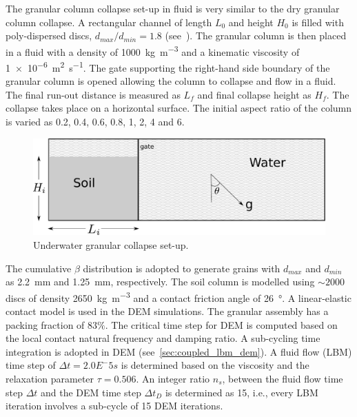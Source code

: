 The granular column collapse set-up in fluid is very similar to the dry 
granular column collapse. A rectangular channel of length $L_0$ and height 
$H_0$ is 
filled with poly-dispersed discs, $d_{max}/d_{min} = 1.8$  
(see~). The granular column is then placed in a fluid with a 
density of \SI{1000}{\kg\per\cubic\meter}  and a kinematic viscosity of 
\SI{1e-6}{\square\meter\per\second}. The gate supporting the right-hand side 
boundary of the granular column is opened allowing the column to collapse and 
flow in a fluid. The final run-out distance is measured as $L_f$ and 
final collapse height as $H_f$. The collapse takes place on a horizontal 
surface. The initial aspect ratio of the column is varied as 0.2, 0.4, 0.6, 
0.8, 1, 2, 4 and 6. 

\begin{figure}[htpb]
\centering
\includegraphics[width=0.97\columnwidth]{geometry}
\caption{Underwater granular collapse set-up.}
\label{fig:geometry}
\end{figure}

The cumulative $\beta$ distribution is adopted to generate grains with 
$d_{max}$ and $d_{min}$ as 2.2~\si{\mm} and 1.25~\si{\mm}, respectively. The 
soil column is modelled using $\sim 2000$ discs of density 
\SI{2650}{\kg\per\cubic\meter} and a contact friction angle of 
\SI{26}{\degree}. A linear-elastic contact model is used in the
DEM simulations. The granular assembly has a packing fraction of $83\%$. The 
critical time step for DEM is computed based on the local 
contact natural frequency and damping ratio. A sub-cycling time integration is 
adopted in DEM (see~\cref{sec:coupled_lbm_dem}). A fluid flow (LBM) time step 
of $\Delta t = 2.0E^-5s$ is determined based on the viscosity and the 
relaxation 
parameter $\tau = 0.506$. An integer ratio $n_s$, between the fluid flow time 
step $\Delta t$ and the DEM time step $\Delta t_D$ is determined as 15, i.e., 
every LBM iteration involves a sub-cycle of 15 DEM iterations.

